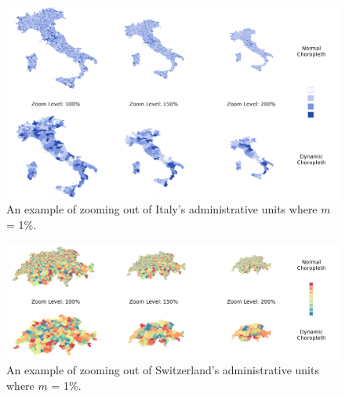 
\newpage
\vfill
\begin{figure}[ht]
\includegraphics[width=1\linewidth]{images/zoomOutExample}
\caption{An example of zooming out of Italy's administrative units where $m$ = 1\%.} \label{fig:zoomout}
\end{figure}
\vfill
\begin{figure}[ht]
\includegraphics[width=1\linewidth]{images/zoomOutExample2}
\caption{ An example of zooming out of Switzerland's administrative units where $m$ = 1\%.}\label{fig:zoomout2}
\end{figure}
\vfill
